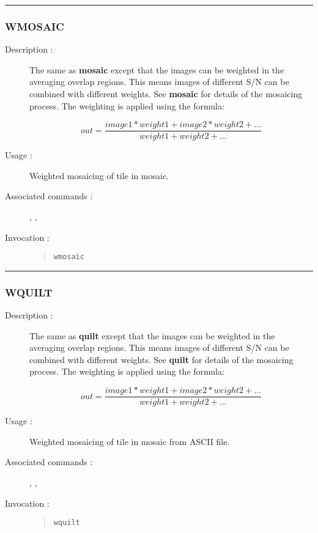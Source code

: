 \hrule
\subsubsection*{\label{WMOSAIC}WMOSAIC}

\begin{description}

\item[Description :] The same as {\bf mosaic} except that the images
can be weighted in the averaging overlap regions.  This means images of
different S/N can be combined with different weights.  See {\bf mosaic}
for details of the mosaicing process.  The weighting is applied using
the formula:

\[out=\frac{image1*weight1+image2*weight2+\ldots}{weight1+weight2+\ldots}\]

\item[Usage :] Weighted mosaicing of tile in mosaic.

\item[Associated commands :] {\tt {}},
{\tt {}}, {\tt {}}

\item[Invocation :]

\begin{quote}{\tt  wmosaic }\end{quote}

\end{description}

\hrule
\subsubsection*{\label{WQUILT}WQUILT}

\begin{description}

\item[Description :] The same as {\bf quilt} except that the images
can be weighted in the averaging overlap regions.  This means images of
different S/N can be combined with different weights.  See {\bf quilt} for
details of the mosaicing process. The weighting is applied using the
formula:

\[out=\frac{image1*weight1+image2*weight2+\ldots}{weight1+weight2+\ldots}\]

\item[Usage :] Weighted mosaicing of tile in mosaic from ASCII file.

\item[Associated commands :] {\tt {}},
{\tt {}}, {\tt {}}

\item[Invocation :]

\begin{quote}{\tt  wquilt }\end{quote}

\end{description}

